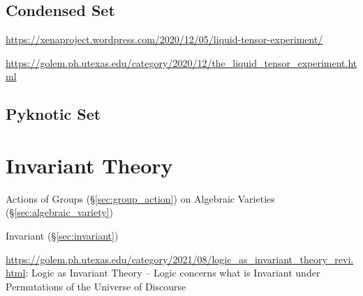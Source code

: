 \subsection{Condensed Set}\label{sec:condensed_set}

\url{https://xenaproject.wordpress.com/2020/12/05/liquid-tensor-experiment/}

\url{https://golem.ph.utexas.edu/category/2020/12/the_liquid_tensor_experiment.html}



\subsection{Pyknotic Set}\label{sec:pyknotic_set}



\section{Invariant Theory}\label{sec:invariant_theory}

Actions of Groups (\S\ref{sec:group_action}) on Algebraic Varieties
(\S\ref{sec:algebraic_variety})

Invariant (\S\ref{sec:invariant})

\url{https://golem.ph.utexas.edu/category/2021/08/logic_as_invariant_theory_revi.html}:
Logic as Invariant Theory -- Logic concerns what is Invariant under Permutations
of the Universe of Discourse
